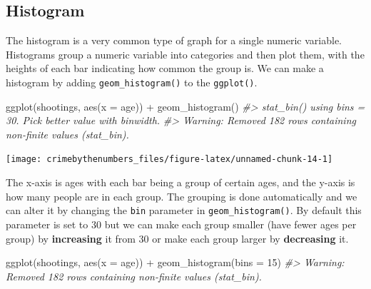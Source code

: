 \documentclass[
]{krantz}
\makeatletter
\newenvironment{Shaded}{\begin{snugshade}}{\end{snugshade}}
\newcommand{\AttributeTok}[1]{\textcolor[rgb]{0.61,0.61,0.61}{#1}}
\newcommand{\CommentTok}[1]{\textcolor[rgb]{0.37,0.37,0.37}{\textit{#1}}}
\newcommand{\DecValTok}[1]{\textcolor[rgb]{0.06,0.06,0.06}{#1}}
\newcommand{\FunctionTok}[1]{\textcolor[rgb]{0,0,0}{#1}}
\newcommand{\NormalTok}[1]{#1}
\newcommand{\SpecialCharTok}[1]{\textcolor[rgb]{0,0,0}{#1}}
\newenvironment{kframe}{%
\medskip{}
\setlength{\fboxsep}{.8em}
 \def\at@end@of@kframe{}%
 \ifinner\ifhmode%
  \def\at@end@of@kframe{\end{minipage}}%
  \begin{minipage}{\columnwidth}%
 \fi\fi%
 \def\FrameCommand##1{\hskip\@totalleftmargin \hskip-\fboxsep
 \colorbox{shadecolor}{##1}\hskip-\fboxsep
     \hskip-\linewidth \hskip-\@totalleftmargin \hskip\columnwidth}%
 \MakeFramed {\advance\hsize-\width
   \@totalleftmargin\z@ \linewidth\hsize
   \@setminipage}}%
 {\par\unskip\endMakeFramed%
 \at@end@of@kframe}
\renewenvironment{Shaded}{\begin{kframe}}{\end{kframe}}
\makeatother
\begin{document}
\hypertarget{histogram}{%
\subsection{Histogram}\label{histogram}}

The histogram is a very common type of graph for a single numeric variable. Histograms group a numeric variable into categories and then plot them, with the heights of each bar indicating how common the group is. We can make a histogram by adding \texttt{geom\_histogram()} to the \texttt{ggplot()}.

\begin{Shaded}
\begin{Highlighting}[]
\FunctionTok{ggplot}\NormalTok{(shootings, }\FunctionTok{aes}\NormalTok{(}\AttributeTok{x =}\NormalTok{ age)) }\SpecialCharTok{+} 
  \FunctionTok{geom\_histogram}\NormalTok{()}
\CommentTok{\#\textgreater{} \textasciigrave{}stat\_bin()\textasciigrave{} using \textasciigrave{}bins = 30\textasciigrave{}. Pick better value with \textasciigrave{}binwidth\textasciigrave{}.}
\CommentTok{\#\textgreater{} Warning: Removed 182 rows containing non{-}finite values (stat\_bin).}
\end{Highlighting}
\end{Shaded}

\begin{center}\texttt{[image: crimebythenumbers\_files/figure-latex/unnamed-chunk-14-1]} \end{center}

The x-axis is ages with each bar being a group of certain ages, and the y-axis is how many people are in each group. The grouping is done automatically and we can alter it by changing the \texttt{bin} parameter in \texttt{geom\_histogram()}. By default this parameter is set to 30 but we can make each group smaller (have fewer ages per group) by \textbf{increasing} it from 30 or make each group larger by \textbf{decreasing} it.

\begin{Shaded}
\begin{Highlighting}[]
\FunctionTok{ggplot}\NormalTok{(shootings, }\FunctionTok{aes}\NormalTok{(}\AttributeTok{x =}\NormalTok{ age)) }\SpecialCharTok{+} 
  \FunctionTok{geom\_histogram}\NormalTok{(}\AttributeTok{bins =} \DecValTok{15}\NormalTok{)}
\CommentTok{\#\textgreater{} Warning: Removed 182 rows containing non{-}finite values (stat\_bin).}
\end{Highlighting}
\end{Shaded}
\end{document}
